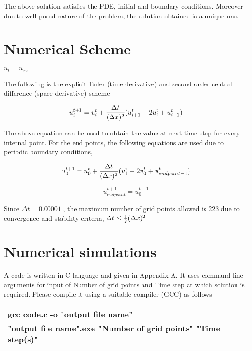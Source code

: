 \documentclass[12pt]{article}
\begin{document}
	The above solution satisfies the PDE, initial and boundary conditions. Moreover due to well posed nature of the problem, the solution obtained is a unique one.
	
	\section{Numerical Scheme}
	
	\begin{center}
		$u_t=u_{xx}$
	\end{center}
	
	The following is the explicit Euler (time derivative) and second order central difference (space derivative) scheme
	
	\begin{center}
		\begin{equation}
		u^{t+1}_{i}= u^t_i + {\Delta t \over (\Delta x)^2} (u^t_{i+1}-2u^t_i+u^t_{i-1})
		\end{equation} 
	\end{center}

	The above equation can be used to obtain the value at next time step for every internal point. For the end points, the following equations are used due to periodic boundary conditions,
	
	\begin{equation}
	u^{t+1}_{0}= u^t_0 + {\Delta t \over (\Delta x)^2} (u^t_{1}-2u^t_0+u^t_{endpoint-1})
	\end{equation} 
	
	\begin{equation}
	u^{t+1}_{endpoint}= u^{t+1}_0
	\end{equation}
	
	Since $\Delta t = 0.00001$ , the maximum number of grid points allowed is 223 due to convergence and stability criteria, $\Delta t \leq {1\over2}(\Delta x)^2$

	\section{Numerical simulations}
	
	A code is written in C language and given in Appendix A. It uses command line arguments for input of Number of grid points and Time step at which solution is required. Please compile it using a suitable compiler (GCC) as follows	
	\begin{center}
		\begin{tabular}{l}
			\textbf{gcc code.c -o "output file name"} \\
			\textbf{"output file name".exe "Number of grid points" "Time step(s)"}
		\end{tabular}
	\end{center}
	
\end{document}
